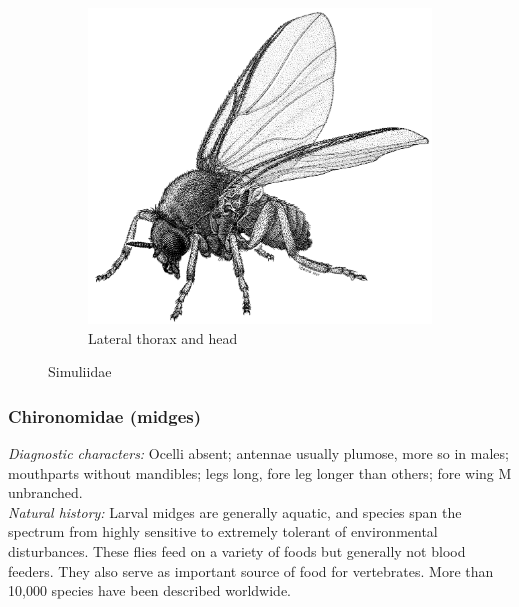 \documentclass[letterpaper, 11pt]{article}
\begin{document}
\begin{figure}[ht!]
\begin{subfigure}[ht!]{0.42\textwidth}
        \includegraphics[width=\textwidth]{SimuliidHabitus}
        \caption{Lateral thorax and head \citep[][Fig. 27.1]{mcalpine1981manual}}
        \label{fig:simuliid2}
    \end{subfigure}
    \caption{Simuliidae}\label{fig:simuliids}
\end{figure}

\subsubsection{Chironomidae (midges)}
\noindent{}\textit{Diagnostic characters:} Ocelli absent; antennae usually plumose, more so in males; mouthparts without mandibles; legs long, fore leg longer than others; fore wing M unbranched.\\

\noindent{}\textit{Natural history:} Larval midges are generally aquatic, and species span the spectrum from highly sensitive to extremely tolerant of environmental disturbances. These flies feed on a variety of foods but generally not blood feeders. They also serve as important source of food for vertebrates. More than 10,000 species have been described worldwide.
\end{document}
